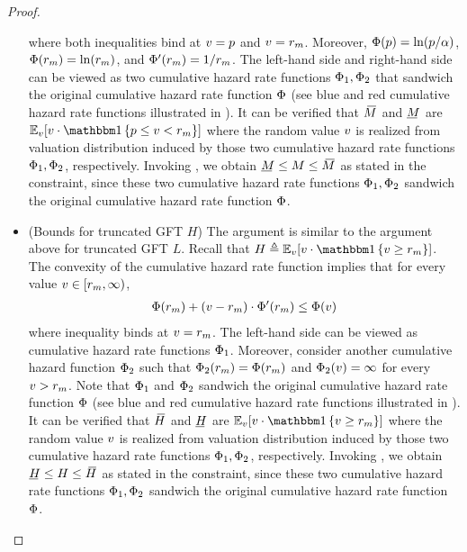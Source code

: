 \begin{proof}
\begin{itemize}
        where both inequalities bind at $v = p$ and $v = r_m$. Moreover, $\Phi(p) = \ln(p/\alpha)$, $\Phi(r_m) = \ln(r_m)$, and $\Phi'(r_m) = 1/r_m$. The left-hand side and right-hand side can be viewed as two cumulative hazard rate functions $\Phi_1, \Phi_2$ that sandwich the original cumulative hazard rate function $\Phi$ (see blue and red cumulative hazard rate functions illustrated in ). It can be verified that $\MOverBar$ and $\MUnderBar$ are $\expect[\val]{\val\cdot \indicator{ \price \leq \val <\optreserve }}$ where the random value $v$ is realized from valuation distribution induced by those two cumulative hazard rate functions $\Phi_1, \Phi_2$, respectively. Invoking , we obtain $\MUnderBar\leq M \leq \MOverBar$ as stated in the constraint, since these two cumulative hazard rate functions $\Phi_1, \Phi_2$ sandwich the original cumulative hazard rate function $\Phi$.
        \item (Bounds for truncated GFT $H$) The argument is similar to the argument above for truncated GFT $L$. Recall that $H \triangleq \expect[\val]{\val\cdot \indicator{\val \geq \optreserve}}$. The convexity of the cumulative hazard rate function implies that for every value $v \in [r_m, \infty)$,
        \begin{align*}
            \Phi(r_m) + (v - r_m) \cdot 
            \Phi'(r_m)
            \leq 
            \Phi(v) 
        \end{align*}
        where inequality binds at $v = r_m$. The left-hand side can be viewed as cumulative hazard rate functions $\Phi_1$. Moreover, consider another cumulative hazard function $\Phi_2$ such that $\Phi_2(r_m) = \Phi(r_m)$ and $\Phi_2(v) = \infty$ for every $v > r_m$. Note that $\Phi_1$ and $\Phi_2$ sandwich the original cumulative hazard rate function $\Phi$ (see blue and red cumulative hazard rate functions illustrated in ). It can be verified that $\HOverBar$ and $\HUnderBar$ are $\expect[\val]{\val\cdot \indicator{  \val \geq\optreserve }}$ where the random value $v$ is realized from valuation distribution induced by those two cumulative hazard rate functions $\Phi_1, \Phi_2$, respectively. Invoking , we obtain $\HUnderBar\leq H \leq \HOverBar$ as stated in the constraint, since these two cumulative hazard rate functions $\Phi_1, \Phi_2$ sandwich the original cumulative hazard rate function $\Phi$.

\end{itemize}
\end{proof}
